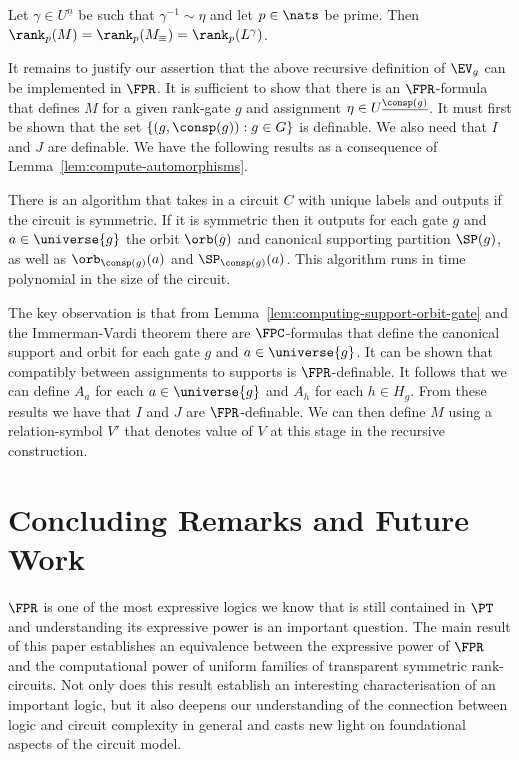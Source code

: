 \documentclass[a4paper,UKenglish]{lipics-v2018}
\begin{document}
\begin{lemma}
	Let $\gamma \in U^{\underline{n}}$ be such that $\gamma^{-1} \sim \eta$ and
  let $p \in \nats$ be prime. Then $\rank_p (M) = \rank_p (M_\equiv) = \rank_p
  (L^{\gamma})$.
  \label{lem:rank-triple-equivilence}
\end{lemma}

It remains to justify our assertion that the above recursive definition of
$\EV_g$ can be implemented in $\FPR$. It is sufficient to show that there is an
$\FPR$-formula that defines $M$ for a given rank-gate $g$ and assignment $\eta
\in U^{\underline{\consp(g)}}$. It must first be shown that the set $\{(g,
\consp(g)) : g \in G\}$ is definable. We also need that $I$ and $J$ are
definable. We have the following results as a consequence of
Lemma~\ref{lem:compute-automorphisms}.

\begin{lemma}
  There is an algorithm that takes in a circuit $C$ with unique labels and
  outputs if the circuit is symmetric. If it is symmetric then it outputs for
  each gate $g$ and $a \in \universe{g}$ the orbit $\orb(g)$ and canonical
  supporting partition $\SP(g)$, as well as $\orb_{\consp(g)}(a)$ and
  $\SP_{\consp(g)}(a)$. This algorithm runs in time polynomial in the size of
  the circuit.
  \label{lem:computing-support-orbit-gate}
\end{lemma}

The key observation is that from Lemma~\ref{lem:computing-support-orbit-gate}
and the Immerman-Vardi theorem there are $\FPC$-formulas that define the
canonical support and orbit for each gate $g$ and $a \in \universe{g}$. It can
be shown that compatibly between assignments to supports is $\FPR$-definable. It
follows that we can define $A_a$ for each $a \in \universe{g}$ and $A_h$ for
each $h \in H_g$. From these results we have that $I$ and $J$ are
$\FPR$-definable. We can then define $M$ using a relation-symbol $V'$ that
denotes value of $V$ at this stage in the recursive construction.

\section{Concluding Remarks and Future Work}
$\FPR$ is one of the most expressive logics we know that is still contained in
$\PT$ and understanding its expressive power is an important question. The main
result of this paper establishes an equivalence between the expressive power of
$\FPR$ and the computational power of uniform families of transparent symmetric
rank-circuits. Not only does this result establish an interesting
characterisation of an important logic, but it also deepens our understanding of
the connection between logic and circuit complexity in general and casts new
light on foundational aspects of the circuit model.
\end{document}
